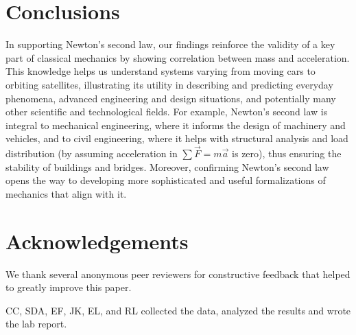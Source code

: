 \documentclass[reprint,amsmath,amssymb,aps,twoside]{revtex4-2}
\begin{document}
\section{Conclusions}
In supporting Newton's second law, our findings reinforce the validity of a key part of classical mechanics by showing correlation between mass and acceleration. This knowledge helps us understand systems varying from moving cars to orbiting satellites, illustrating its utility in describing and predicting everyday phenomena, advanced engineering and design situations, and potentially many other scientific and technological fields. For example, Newton's second law is integral to mechanical engineering, where it informs the design of machinery and vehicles, and to civil engineering, where it helps with structural analysis and load distribution (by assuming acceleration in $\sum \vec{F}=m\vec{a}$ is zero), thus ensuring the stability of buildings and bridges. Moreover, confirming Newton's second law opens the way to developing more sophisticated and useful formalizations of mechanics that align with it.


\section{Acknowledgements}
\label{sec:acknowledgements}
We thank several anonymous peer reviewers for constructive feedback that helped to greatly improve this paper.

CC, SDA, EF, JK, EL, and RL collected the data, analyzed the results and wrote the lab report.


%

\end{document}
